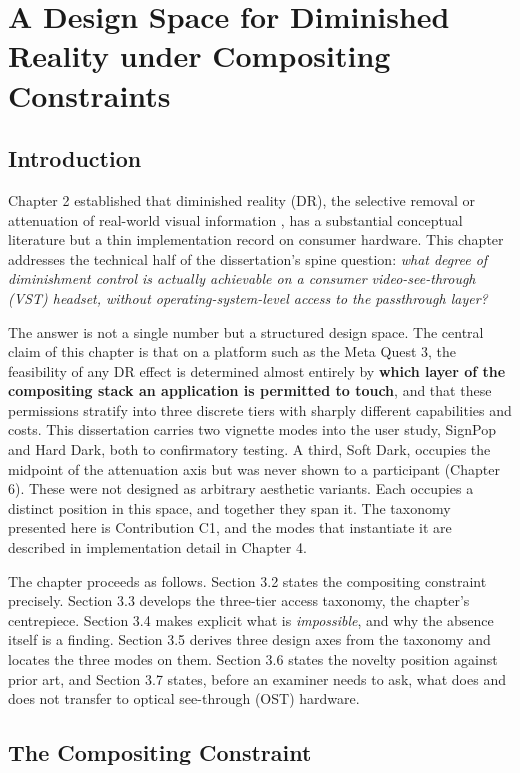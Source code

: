 \chapter{A Design Space for Diminished Reality under Compositing Constraints}

\section{Introduction}

Chapter 2 established that diminished reality (DR), the selective removal or attenuation of
real-world visual information \citep{mori2017}, has a substantial conceptual literature
but a thin implementation record on consumer hardware. This chapter addresses the technical half of the dissertation's spine
question: \textit{what degree of diminishment control is actually achievable on a consumer video-see-through
(VST) headset, without operating-system-level access to the passthrough layer?}

The answer is not a single number but a structured design space. The central claim of this chapter is
that on a platform such as the Meta Quest 3, the feasibility of any DR effect is determined almost
entirely by \textbf{which layer of the compositing stack an application is permitted to touch}, and that
these permissions stratify into three discrete tiers with sharply different capabilities and costs.
This dissertation carries two vignette modes into the user study, SignPop and Hard Dark, both to
confirmatory testing. A third, Soft Dark, occupies the midpoint of the attenuation axis but was never
shown to a participant (Chapter 6). These were not
designed as arbitrary aesthetic variants. Each occupies a distinct position in this space, and
together they span it. The taxonomy presented here is Contribution C1, and the modes that instantiate
it are described in implementation detail in Chapter 4.

The chapter proceeds as follows. Section 3.2 states the compositing constraint precisely.
Section 3.3 develops the three-tier access taxonomy, the chapter's centrepiece. Section 3.4 makes
explicit what is \textit{impossible}, and why the absence itself is a finding. Section 3.5 derives three
design axes from the taxonomy and locates the three modes on them. Section 3.6 states the novelty
position against prior art, and Section 3.7 states, before an examiner needs to ask, what does and
does not transfer to optical see-through (OST) hardware.

\section{The Compositing Constraint}

